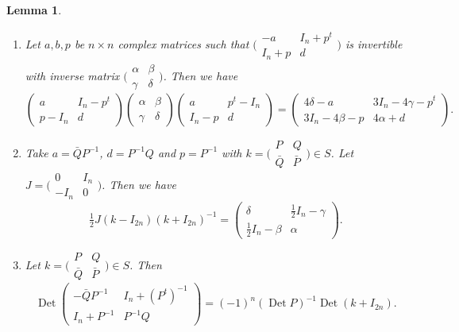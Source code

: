 \documentclass[12pt]{amsart}
\numberwithin{equation}{section}
\newtheorem{lemma}[theorem]{Lemma}
\DeclareMathOperator{\Det}{Det} \DeclareMathOperator{\Tr}{Tr}
\begin{document}
\begin{lemma} \label{lemmatrices} \begin{enumerate}
\item Let $a,b, p$ be $n\times n$ complex matrices such that
$\bigl(\begin{smallmatrix} -a&I_n+p^t\\
I_n+p&d \end{smallmatrix}\bigr)$ is invertible with inverse matrix $\bigl(\begin{smallmatrix} \alpha &\beta \\
\gamma & \delta  \end{smallmatrix}\bigr)$. Then we have
\begin{equation*}\begin{pmatrix} a&I_n-p^t\\
p-I_n&d \end{pmatrix}\begin{pmatrix} \alpha &\beta \\
\gamma & \delta  \end{pmatrix} \begin{pmatrix} a&p^t-I_n\\
I_n-p&d \end{pmatrix}=\begin{pmatrix}4\delta -a&3I_n-4\gamma -p^t\\
3I_n-4\beta-p&4\alpha+d \end{pmatrix}.
\end{equation*}
\item Take $a={\bar Q}P^{-1}$, $d=P^{-1}Q$ and $p=P^{-1}$ with 
$k=\bigl(\begin{smallmatrix} P&Q\\
{\bar Q}&{\bar P} \end{smallmatrix}\bigr)\in S$. Let $J=\bigl(\begin{smallmatrix} 0&I_n\\
-I_n&0 \end{smallmatrix}\bigr)$. Then we have
\begin{equation*}\tfrac{1}{2}J(k-I_{2n})(k+I_{2n})^{-1}=\begin{pmatrix}\delta &\tfrac{1}{2}I_n-\gamma\\
\tfrac{1}{2}I_n-\beta&\alpha \end{pmatrix}.\end{equation*}
\item Let $k=\bigl(\begin{smallmatrix} P&Q\\
{\bar Q}&{\bar P} \end{smallmatrix}\bigr)\in S$. Then
\begin{equation*}\Det \begin{pmatrix}-{\bar Q}P^{-1} &I_n+(P^t)^{-1}\\
I_n+P^{-1}&P^{-1}Q \end{pmatrix}=(-1)^n(\Det P)^{-1}\Det(k+I_{2n}).
\end{equation*}\end{enumerate}
\end{lemma}
\end{document}
